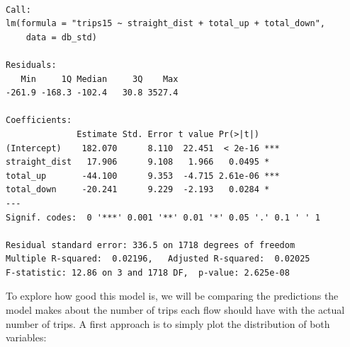 \documentclass[
  letterpaper,
  DIV=11,
  numbers=noendperiod,
  oneside]{scrreprt}
\newenvironment{Shaded}{\begin{snugshade}}{\end{snugshade}}
\newcommand{\AttributeTok}[1]{\textcolor[rgb]{0.40,0.45,0.13}{#1}}
\newcommand{\DecValTok}[1]{\textcolor[rgb]{0.68,0.00,0.00}{#1}}
\newcommand{\FunctionTok}[1]{\textcolor[rgb]{0.28,0.35,0.67}{#1}}
\newcommand{\NormalTok}[1]{\textcolor[rgb]{0.00,0.23,0.31}{#1}}
\newcommand{\SpecialCharTok}[1]{\textcolor[rgb]{0.37,0.37,0.37}{#1}}
\newcommand{\StringTok}[1]{\textcolor[rgb]{0.13,0.47,0.30}{#1}}
\begin{document}
\begin{verbatim}

Call:
lm(formula = "trips15 ~ straight_dist + total_up + total_down", 
    data = db_std)

Residuals:
   Min     1Q Median     3Q    Max 
-261.9 -168.3 -102.4   30.8 3527.4 

Coefficients:
              Estimate Std. Error t value Pr(>|t|)    
(Intercept)    182.070      8.110  22.451  < 2e-16 ***
straight_dist   17.906      9.108   1.966   0.0495 *  
total_up       -44.100      9.353  -4.715 2.61e-06 ***
total_down     -20.241      9.229  -2.193   0.0284 *  
---
Signif. codes:  0 '***' 0.001 '**' 0.01 '*' 0.05 '.' 0.1 ' ' 1

Residual standard error: 336.5 on 1718 degrees of freedom
Multiple R-squared:  0.02196,   Adjusted R-squared:  0.02025 
F-statistic: 12.86 on 3 and 1718 DF,  p-value: 2.625e-08
\end{verbatim}

To explore how good this model is, we will be comparing the predictions
the model makes about the number of trips each flow should have with the
actual number of trips. A first approach is to simply plot the
distribution of both variables:

\begin{Shaded}
\end{Shaded}
\end{document}
